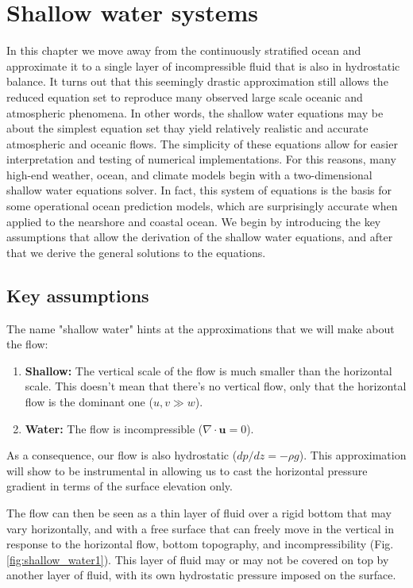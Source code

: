 \documentclass[12pt]{article}
\numberwithin{equation}{section}
\numberwithin{figure}{section}
\numberwithin{table}{section}
\begin{document}
\newpage
\section{Shallow water systems}
\label{sec:shallow_water_systems}

In this chapter we move away from the continuously stratified ocean and
approximate it to a single layer of incompressible fluid that is also in
hydrostatic balance.
It turns out that this seemingly drastic approximation still allows the
reduced equation set to reproduce many observed large scale oceanic and
atmospheric phenomena.
In other words, the shallow water equations may be about the simplest equation
set thay yield relatively realistic and accurate atmospheric and oceanic flows.
The simplicity of these equations allow for easier interpretation and testing
of numerical implementations.
For this reasons, many high-end weather, ocean, and climate models begin with
a two-dimensional shallow water equations solver.
In fact, this system of equations is the basis for some operational
ocean prediction models, which are surprisingly accurate when applied to the
nearshore and coastal ocean.
We begin by introducing the key assumptions that allow the derivation of the
shallow water equations, and after that we derive the general solutions to the
equations.

\subsection{Key assumptions}

The name "shallow water" hints at the approximations that we will make about
the flow:

\begin{enumerate}
  \item \textbf{Shallow:} The vertical scale of the flow is much smaller than the
    horizontal scale. This doesn't mean that there's no vertical
    flow, only that the horizontal flow is the dominant one ($u, v \gg w$).
  \item \textbf{Water:} The flow is incompressible ($\nabla \cdot \mathbf{u} = 0$).
\end{enumerate}
As a consequence, our flow is also hydrostatic ($dp/dz = -\rho g$).
This approximation will show to be instrumental in allowing us to cast the 
horizontal pressure gradient in terms of the surface elevation only.

The flow can then be seen as a thin layer of fluid over a rigid bottom
that may vary horizontally, and with a free surface that can freely
move in the vertical in response to the horizontal flow, bottom topography, and
incompressibility (Fig. \ref{fig:shallow_water1}).
This layer of fluid may or may not be covered on top by another layer of fluid,
with its own hydrostatic pressure imposed on the surface.
\end{document}
